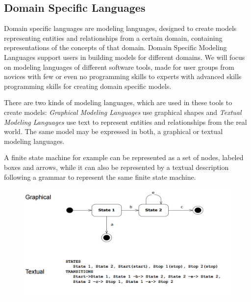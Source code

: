 \documentclass[runningheads,a4paper]{llncs}
\begin{document}
 \subsection{Domain Specific Languages}
 Domain specific languages are modeling languages, designed to create models representing entities and relationships from a certain domain,
 containing representations of the concepts of that domain. 
 Domain Specific Modeling Languages support users in building models for different domains.
 We will focus on modeling languages of different software tools, made for user groups from novices with few or even no programming skills to experts 
 with advanced skills programming skills for creating domain specific models. 
 
 There are two kinds of modeling languages, which are used in these tools to create models:
 \emph{Graphical Modeling Languages} use graphical shapes and
 \emph{Textual Modeling Languages} use text to represent entities and relationships from the real world.
 The same model may be expressed in both, a graphical or textual modeling languages.
 
 A finite state machine for example can be represented as a set of nodes, labeled boxes and arrows, while it can also be 
 represented by a textual description following a grammar to represent the same finite state machine.
 
  \begin{figure}[H]
      \centering
      \includegraphics[width=\textwidth]{images/GraficalTextualComparison.PNG}
    \end{figure}
 
%  
 
\end{document}
